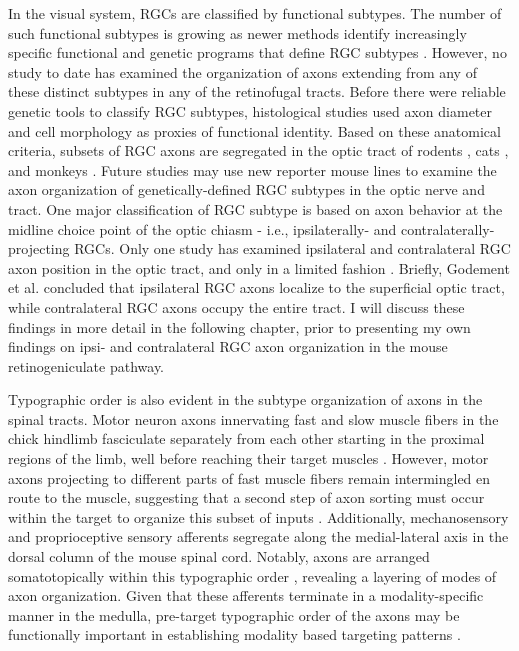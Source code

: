 In the visual system, RGCs are classified by functional subtypes.
The number of such functional subtypes is growing as newer methods identify increasingly specific functional and genetic programs that define RGC subtypes \cite{baden2016functional,rivlin2011transgenic}.
However, no study to date has examined the organization of axons extending from any of these distinct subtypes in any of the retinofugal tracts.
Before there were reliable genetic tools to classify RGC subtypes, histological studies used axon diameter and cell morphology as proxies of functional identity.
Based on these anatomical criteria, subsets of RGC axons are segregated in the optic tract of rodents \cite{reese1987distributionrat}, cats \cite{guillery1982arrangement,torrealba1982studies}, and monkeys \cite{reese1990fibre}.
Future studies may use new reporter mouse lines to examine the axon organization of genetically-defined RGC subtypes in the optic nerve and tract.
One major classification of RGC subtype is based on axon behavior at the midline choice point of the optic chiasm - i.e., ipsilaterally- and contralaterally-projecting RGCs.
Only one study has examined ipsilateral and contralateral RGC axon position in the optic tract, and only in a limited fashion \cite{godement1984prenatal}.
Briefly, Godement et al.  concluded that ipsilateral RGC axons localize to the superficial optic tract, while contralateral RGC axons occupy the entire tract.
I will discuss these findings in more detail in the following chapter, prior to presenting my own findings on ipsi- and contralateral RGC axon organization in the mouse retinogeniculate pathway.

Typographic order is also evident in the subtype organization of axons in the spinal tracts.
Motor neuron axons innervating fast and slow muscle fibers in the chick hindlimb fasciculate separately from each other starting in the proximal regions of the limb, well before reaching their target muscles \cite{milner1998selective}.
However, motor axons projecting to different parts of fast muscle fibers remain intermingled en route to the muscle, suggesting that a second step of axon sorting must occur within the target to organize this subset of inputs \cite{milner1998selective}.
Additionally, mechanosensory and proprioceptive sensory afferents segregate along the medial-lateral axis in the dorsal column of the mouse spinal cord.
Notably, axons are arranged somatotopically within this typographic order \cite{niu2013modality}, revealing a layering of modes of axon organization.
Given that these afferents terminate in a modality-specific manner in the medulla, pre-target typographic order of the axons may be functionally important in establishing modality based targeting patterns \cite{niu2013modality}.

